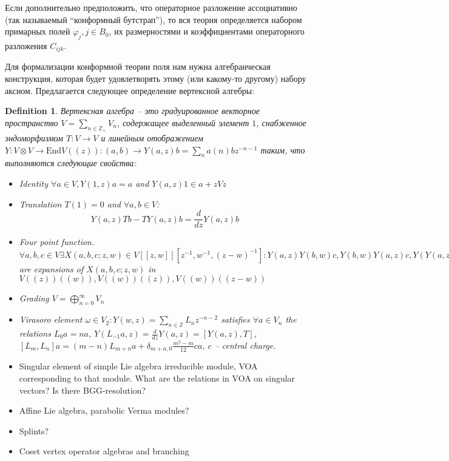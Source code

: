 \documentclass[12pt]{article}
\newtheorem{Def}{Definition}[section]
\begin{document}
Если дополнительно предположить, что операторное разложение ассоциативно (так называемый
``конформный бутстрап''), то вся теория определяется набором примарных полей $\varphi_{j}, j\in
B_{0}$, их размерностями и коэффициентами операторного разложения $C_{ijk}$.

Для формализации конформной теории поля нам нужна алгебраическая конструкция, которая будет
удовлетворять этому (или какому-то другому) набору аксиом. Предлагается следующее определение
вертексной алгебры:

\begin{Def}
  Вертексная алгебра -- это градуированное векторное пространство $V=\sum_{n\in \mathbb{Z}_{+}}
  V_{n}$, содержащее выделенный элемент $1$, снабженное эндоморфизмом
  $T:V\to V$  и линейным отображением $Y:V\otimes V\to \mathrm{End}V((z)):
  (a,b)\to Y(a,z)b=\sum_n a (n) b z^{-n-1}$
  таким, что выполняются следующие свойства:
  \begin{itemize}
  \item {\it Identity} $\forall a\in V, Y(1,z) a =a$ and $Y(a,z) 1 \in a+z V z$
  \item {\it Translation} $T(1)=0$ and $\forall a,b\in V$:
    $$Y(a,z)T b - T Y(a,z) b =
    \frac{d}{dz} Y(a,z) b$$
  \item {\it Four point function}. $\forall a,b,c\in V \exists
    X(a,b,c;z,w)\in V[[z,w]][z^{-1},w^{-1},(z-w)^{-1}]: Y(a,z)Y(b,w)c,
    Y(b,w)Y(a,z)c, Y(Y(a,z-w)b,w)c$ are expansions of $X(a,b,c;z,w)$
    in $V((z))((w)), V((w))((z)), V((w))((z-w))$
  \item {\it Grading} $V=\bigoplus_{n=0}^{\infty} V_n$
  \item {\it Virasoro element} $\omega\in V_2: Y(w,z)=\sum_{n\in
      \mathbb{Z}} L_n z^{-n-2}$ satisfies $\forall a\in V_n$ the
      relations $L_0 a =n a$,
      $Y(L_{-1}a,z)=\frac{d}{dz}Y(a,z)=[Y(a,z),T]$,
      $[L_m,L_n]a=(m-n)L_{m+n} a + \delta_{m+n,0} \frac{m^3 -
        m}{12}ca$, $c$ -- central charge.
  \end{itemize}

\end{Def}

\begin{itemize}
\item Singular element of simple Lie algebra irreducible module, VOA corresponding to that module.
  What are the relations in VOA on singular vectors? Is there BGG-resolution?
\item Affine Lie algebra, parabolic Verma modules?
\item Splints?
\item Coset vertex operator algebras and branching
\end{itemize}

{}

\end{document}
